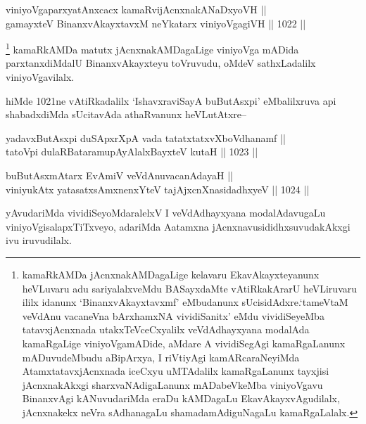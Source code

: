 
\begin{shl}
viniyoVgaparxyatAnxcacx kamaRvijAcnxnakANaDxyoVH || \\
gamayxteV BinanxvAkayxtavxM neYkatarx viniyoVgagiVH \hfill || 1022 ||  
\end{shl}

\begin{artha}
\footnote{kamaRkAMDa jAcnxnakAMDagaLige kelavaru EkavAkayxteyanunx heVLuvaru adu sariyalalxveMdu BASayxdaMte vAtiRkakArarU heVLiruvaru ililx idanunx `BinanxvAkayxtavxmf' eMbudanunx sUcisidAdxre.`tameVtaM veVdAnu vacaneVna bArxhamxNA vividiSanitx' eMdu vividiSeyeMba tatavxjAcnxnada utakxTeVceCxyalilx veVdAdhayxyana modalAda kamaRgaLige viniyoVgamADide, aMdare A vividiSegAgi kamaRgaLanunx mADuvudeMbudu aBipArxya, I riVtiyAgi kamARcaraNeyiMda AtamxtatavxjAcnxnada iceCxyu uMTAdalilx kamaRgaLanunx tayxjisi jAcnxnakAkxgi sharxvaNAdigaLanunx mADabeVkeMba viniyoVgavu BinanxvAgi kANuvudariMda eraDu kAMDagaLu EkavAkayxvAgudilalx, jAcnxnakekx neVra sAdhanagaLu shamadamAdiguNagaLu kamaRgaLalalx.} kamaRkAMDa matutx jAcnxnakAMDagaLige viniyoVga mADida parxtanxdiMdalU BinanxvAkayxteyu toVruvudu, oMdeV sathxLadalilx viniyoVgavilalx.
\end{artha}

\begin{artha}
hiMde 1021ne vAtiRkadalilx `IshavxraviSayA buButAsxpi' eMbalilxruva api shabadxdiMda sUcitavAda athaRvanunx heVLutAtxre--
\end{artha}

\begin{shl}
yadavxButAsx\s pi duSApxrXpA vada tatatxtatxvXboVdhanamf || \\
tatoV\s pi dulaRBataramupAyAlalxBayxteV kutaH \hfill || 1023 ||  
\end{shl}


\begin{shl}
buButAsxmAtarx EvAmiV veVdAnuvacanAdayaH || \\
viniyukAtx yatasatxsAmxnenxYteV tajAjxcnXnasidadhxyeV \hfill || 1024 ||  
\end{shl}

\begin{artha}
yAvudariMda vividiSeyoMdaralelxV I veVdAdhayxyana modalAdavugaLu viniyoVgisalapxTiTxveyo, adariMda Aatamxna jAcnxnavusididhxsuvudakAkxgi ivu iruvudilalx.
\end{artha}

